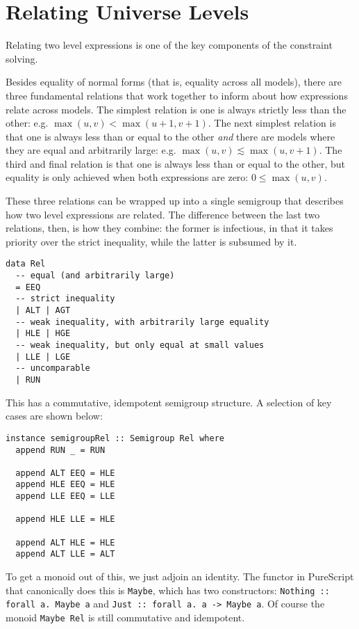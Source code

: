 \documentclass[11pt, twoside, reqno]{book}
\begin{document}
\section{Relating Universe Levels}
\label{rel-uni-lvl}

Relating two level expressions is one of the key components of the constraint solving.

Besides equality of normal forms (that is, equality across all models), there are three fundamental relations that work together to inform about how expressions relate across models.
The simplest relation is one is always strictly less than the other: e.g. $\max(u,v) < \max(u+1,v+1)$.
The next simplest relation is that one is always less than or equal to the other \emph{and} there are models where they are equal and arbitrarily large: e.g. $\max(u,v) \lesssim \max(u,v+1)$.
The third and final relation is that one is always less than or equal to the other, but equality is only achieved when both expressions are zero: $0 \leqslant \max(u,v)$.

These three relations can be wrapped up into a single semigroup that describes how two level expressions are related.
The difference between the last two relations, then, is how they combine: the former is infectious, in that it takes priority over the strict inequality, while the latter is subsumed by it.

\begin{verbatim}
data Rel
  -- equal (and arbitrarily large)
  = EEQ
  -- strict inequality
  | ALT | AGT
  -- weak inequality, with arbitrarily large equality
  | HLE | HGE
  -- weak inequality, but only equal at small values
  | LLE | LGE
  -- uncomparable
  | RUN
\end{verbatim}

This has a commutative, idempotent semigroup structure.
A selection of key cases are shown below:
\begin{verbatim}
instance semigroupRel :: Semigroup Rel where
  append RUN _ = RUN

  append ALT EEQ = HLE
  append HLE EEQ = HLE
  append LLE EEQ = LLE

  append HLE LLE = HLE

  append ALT HLE = HLE
  append ALT LLE = ALT
\end{verbatim}

To get a monoid out of this, we just adjoin an identity.
The functor in PureScript that canonically does this is \verb`Maybe`, which has two constructors: \verb`Nothing :: forall a. Maybe a` and \verb`Just :: forall a. a -> Maybe a`.
Of course the monoid \verb`Maybe Rel` is still commutative and idempotent.
\end{document}
